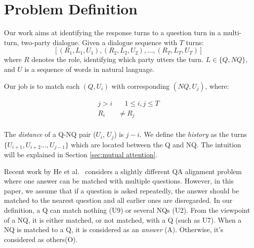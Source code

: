 \section{Problem Definition}
\label{sec:problem}

Our work aims at identifying the response turns to a question turn in a multi-turn,
two-party dialogue. Given a dialogue sequence with $T$ turns: 
$$[(R_1,L_1,U_1),(R_2,L_2,U_2),...,(R_T,L_T,U_T)]$$ 
where $R$ denotes the role, identifying which party utters
the turn. $L\in\{Q, NQ\}$, and $U$ is a sequence of words in natural language. 


Our job is to match each $(Q, U_i)$ with corresponding $(NQ, U_j)$, where:

\begin{equation}
\begin{aligned}
j>i&\quad 1\leq i,j\leq T\\
R_i&\not=R_j\\
\end{aligned}
\end{equation}

The {\em distance} of a Q-NQ pair ($U_i$, $U_j$) is $j-i$. We define
the {\em history} as the turns 
$\{U_{i+1},U_{i+2}...,U_{j-1}\}$ which are located between the Q and NQ. The intuition will be explained in Section \ref{sec:mutual attention}.

Recent work by He et al.~\cite{he2019learning} considers a slightly different 
QA alignment problem where one answer can be matched with multiple questions. 
However, in this paper, we assume that if a question is asked repeatedly, the answer should be matched to 
the nearest question and all earlier ones are disregarded. 
In our definition, a Q can match nothing (U9) or several NQs (U2). From the viewpoint of a NQ, it is 
either matched, or not matched, with a Q (such as U7). When a NQ is matched to a Q, it is 
considered as an {\em answer} (A). Otherwise, it's considered as others(O).

